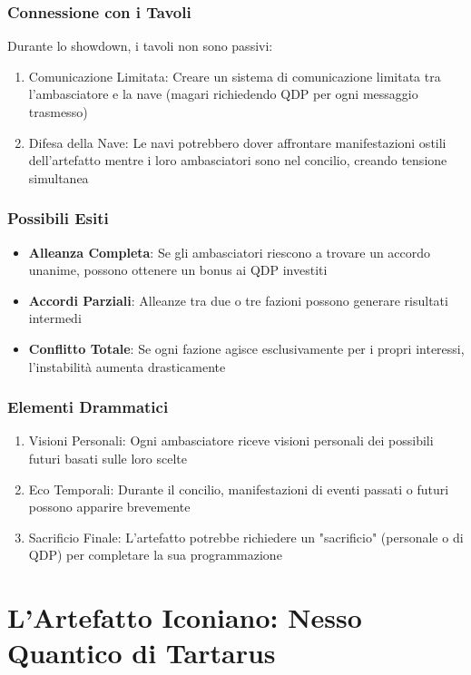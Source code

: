 \documentclass[letterpaper,twocolumn,openany,nodeprecatedcode]{dndbook}
\begin{document}
\subsection {Connessione con i Tavoli}
Durante lo showdown, i tavoli non sono passivi:
\begin{enumerate}
    \item Comunicazione Limitata: Creare un sistema di comunicazione limitata tra l'ambasciatore e la nave (magari richiedendo QDP per ogni messaggio trasmesso)
    \item Difesa della Nave: Le navi potrebbero dover affrontare manifestazioni ostili dell'artefatto mentre i loro ambasciatori sono nel concilio, creando tensione simultanea
\end{enumerate}

\subsection{Possibili Esiti}
\begin{itemize}
    \item \textbf{Alleanza Completa}: Se gli ambasciatori riescono a trovare un accordo unanime, possono ottenere un bonus ai QDP investiti
    \item \textbf{Accordi Parziali}: Alleanze tra due o tre fazioni possono generare risultati intermedi
    \item \textbf{Conflitto Totale}: Se ogni fazione agisce esclusivamente per i propri interessi, l'instabilità aumenta drasticamente
\end{itemize}

\subsection{Elementi Drammatici}
\begin{enumerate}
    \item Visioni Personali: Ogni ambasciatore riceve visioni personali dei possibili futuri basati sulle loro scelte
    \item Eco Temporali: Durante il concilio, manifestazioni di eventi passati o futuri possono apparire brevemente
    \item Sacrificio Finale: L'artefatto potrebbe richiedere un "sacrificio" (personale o di QDP) per completare la sua programmazione
\end{enumerate}

\chapter{L'Artefatto Iconiano: Nesso Quantico di Tartarus}
\end{document}
